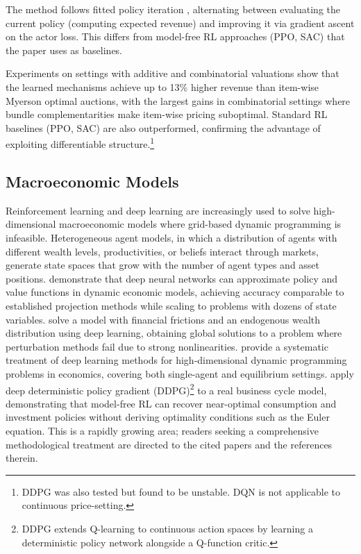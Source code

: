 The method follows fitted policy iteration \citep{bertsekastsitsiklis1996}, alternating between evaluating the current policy (computing expected revenue) and improving it via gradient ascent on the actor loss. This differs from model-free RL approaches (PPO, SAC) that the paper uses as baselines.

Experiments on settings with additive and combinatorial valuations show that the learned mechanisms achieve up to 13\% higher revenue than item-wise Myerson optimal auctions, with the largest gains in combinatorial settings where bundle complementarities make item-wise pricing suboptimal. Standard RL baselines (PPO, SAC) are also outperformed, confirming the advantage of exploiting differentiable structure.\footnote{DDPG was also tested but found to be unstable. DQN is not applicable to continuous price-setting.}


\subsection{Macroeconomic Models}

Reinforcement learning and deep learning are increasingly used to solve high-dimensional macroeconomic models where grid-based dynamic programming is infeasible. Heterogeneous agent models, in which a distribution of agents with different wealth levels, productivities, or beliefs interact through markets, generate state spaces that grow with the number of agent types and asset positions. \citet{MaliarMaliarWinant2021} demonstrate that deep neural networks can approximate policy and value functions in dynamic economic models, achieving accuracy comparable to established projection methods while scaling to problems with dozens of state variables. \citet{FernandezVillaverdeHurtadoNuno2023} solve a model with financial frictions and an endogenous wealth distribution using deep learning, obtaining global solutions to a problem where perturbation methods fail due to strong nonlinearities. \citet{FernandezVillaverdeNunoPerla2024} provide a systematic treatment of deep learning methods for high-dimensional dynamic programming problems in economics, covering both single-agent and equilibrium settings. \citet{AtashbarShi2023} apply deep deterministic policy gradient (DDPG)\footnote{DDPG extends Q-learning to continuous action spaces by learning a deterministic policy network alongside a Q-function critic.} to a real business cycle model, demonstrating that model-free RL can recover near-optimal consumption and investment policies without deriving optimality conditions such as the Euler equation. This is a rapidly growing area; readers seeking a comprehensive methodological treatment are directed to the cited papers and the references therein.


